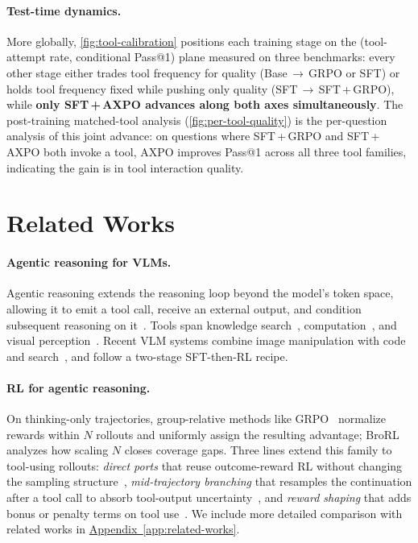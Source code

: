 \documentclass{llmxive}
\providecommand{\appref}[1]{\hyperref[#1]{Appendix~\ref*{#1}}}
\begin{document}
\paragraph{Test-time dynamics.}
More globally, \autoref{fig:tool-calibration} positions each training stage on the (tool-attempt rate, conditional Pass@1) plane measured on three benchmarks: every other stage either trades tool frequency for quality (Base\,$\to$\,GRPO or SFT) or holds tool frequency fixed while pushing only quality (SFT\,$\to$\,SFT\,+\,GRPO), while \textbf{only SFT\,+\,AXPO advances along both axes simultaneously}. The post-training matched-tool analysis (\autoref{fig:per-tool-quality}) is the per-question analysis of this joint advance: on questions where SFT\,+\,GRPO and SFT\,+\,AXPO both invoke a tool, AXPO improves Pass@1 across all three tool families, indicating the gain is in tool interaction quality.
\section{Related Works}
\label{sec:related}

\paragraph{Agentic reasoning for VLMs.}
Agentic reasoning extends the reasoning loop beyond the model's token space, allowing it to emit a tool call, receive an external output, and condition subsequent reasoning on it~\citep{ReAct, AgenticReasoning}. Tools span knowledge search~\citep{Search-o1, Search-R1}, computation~\citep{tora, TIR, retool, mathcoder, T1}, and visual perception~\citep{pixelreasoner, mini-o3, pyvision, deepeyes, agenticvision, thinkingwithimages}. Recent VLM systems combine image manipulation with code and search~\citep{mmsearch, deepeyesv2, pyvision-rl, visualsketchpad, vthinker}, and follow a two-stage SFT-then-RL recipe.

\paragraph{RL for agentic reasoning.}
On thinking-only trajectories, group-relative methods like GRPO~\citep{GRPO, DAPO, prorl} normalize rewards within $N$ rollouts and uniformly assign the resulting advantage; BroRL~\citep{brorl} analyzes how scaling $N$ closes coverage gaps. Three lines extend this family to tool-using rollouts: \emph{direct ports} that reuse outcome-reward RL without changing the sampling structure~\citep{deepeyes, deepeyesv2, rstar2, ToolRL, torl, thyme, AgenticReasoningRL, hrmmsearch}, \emph{mid-trajectory branching} that resamples the continuation after a tool call to absorb tool-output uncertainty~\citep{arpo, aepo}, and \emph{reward shaping} that adds bonus or penalty terms on tool use~\citep{pyvision-rl, otc}. We include more detailed comparison with related works in \appref{app:related-works}.
\end{document}
